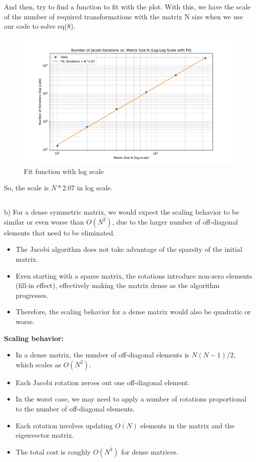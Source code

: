 \documentclass[english,notitlepage]{revtex4-1}
\begin{document}
And then, try to find a function to fit with the plot. With this, we have the scale of the number of required transformations with the matrix N size when we use our code to solve eq(8).
\begin{figure} [H]
    \centering
    \includegraphics[width=0.75\linewidth]{problem5/jacobi_iterations_loglog_fit.pdf}
    \caption{Fit function with log scale}
    \label{fig:enter-label}
\end{figure}
So, the scale is $N*2.07$ in log scale.
\subsection*{}
b) 
For a dense symmetric matrix, we would expect the scaling behavior to be similar or even worse than \(O(N^2)\), due to the larger number of off-diagonal elements that need to be eliminated.

\begin{itemize}
    \item The Jacobi algorithm does not take advantage of the sparsity of the initial matrix.
    \item Even starting with a sparse matrix, the rotations introduce non-zero elements (fill-in effect), effectively making the matrix dense as the algorithm progresses.
    \item Therefore, the scaling behavior for a dense matrix would also be quadratic or worse.
\end{itemize}

\textbf{Scaling behavior:}

\begin{itemize}
    \item In a dense matrix, the number of off-diagonal elements is \( N(N - 1)/2 \), which scales as \( O(N^2) \).
    \item Each Jacobi rotation zeroes out one off-diagonal element.
    \item In the worst case, we may need to apply a number of rotations proportional to the number of off-diagonal elements.
    \item Each rotation involves updating \( O(N) \) elements in the matrix and the eigenvector matrix.
    \item The total cost is roughly \( O(N^3) \) for dense matrices.
\end{itemize}
\end{document}
